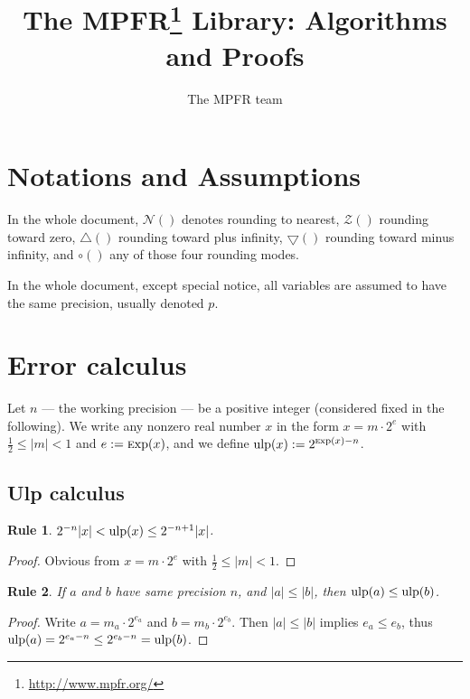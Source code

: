 \documentclass[12pt]{amsart}
\title{The MPFR\footnote{\lowercase{\url{http://www.mpfr.org/}}} Library:
Algorithms and Proofs}
\author{The MPFR team}
\def\pinf{\bigtriangleup}
\def\minf{\bigtriangledown}
\def\ulp{{\rm ulp}}
\def\Exp{{\rm \textsc exp}}
\def\Z{{\mathcal Z}}
\def\N{{\mathcal N}}
\newtheorem{Rule}{Rule}
\begin{document}
\maketitle
\sloppy

\tableofcontents

\section{Notations and Assumptions}

In the whole document, $\N()$ denotes rounding to nearest,
$\Z()$ rounding toward zero,
$\pinf()$ rounding toward plus infinity,
$\minf()$ rounding toward minus infinity,
and $\circ()$ any of those four rounding modes.

In the whole document, except special notice, all variables are assumed
to have the same precision, usually denoted $p$.

\section{Error calculus}

Let $n$ --- the working precision ---
be a positive integer (considered fixed in the following).
We write any nonzero real number $x$ in the form $x = m \cdot 2^e$
with $\frac{1}{2} \le |m| < 1$ and $e := \Exp(x)$, and
we define $\ulp(x) := 2^{\Exp(x) - n}$.

\subsection{Ulp calculus}

\begin{Rule} \label{R1}
$2^{-n} |x| < \ulp(x) \le 2^{-n+1} |x|$.
\end{Rule}
\begin{proof}
Obvious from $x = m \cdot 2^e$ with $\frac{1}{2} \le |m| < 1$.
\end{proof}

\begin{Rule} \label{R2}
If $a$ and $b$ have same precision $n$,
and $|a| \le |b|$, then $\ulp(a) \le \ulp(b)$.
\end{Rule}
\begin{proof}
Write $a = m_a \cdot 2^{e_a}$ and $b = m_b \cdot 2^{e_b}$.
Then $|a| \le |b|$ implies $e_a \le e_b$, thus
$\ulp(a) = 2^{e_a-n} \le 2^{e_b-n} = \ulp(b)$.
\end{proof}
\end{document}

